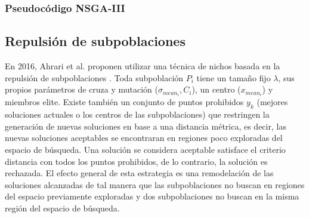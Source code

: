 \documentclass[letterpaper,10pt]{article}
\begin{document}
\subsubsection{Pseudocódigo NSGA-III}
 

\subsection{Repulsión de subpoblaciones}

En 2016, Ahrari et al. proponen utilizar una técnica de nichos basada en la repulsión de subpoblaciones \cite{ahrari2016multimodal}. Toda subpoblación $P_i$ tiene un tamaño fijo $\lambda$,
sus propios parámetros de cruza y mutación ($\sigma_{mean_i},C_i$), un centro ($x_{mean_i}$) y miembros elite. Existe también un conjunto de puntos prohibidos $y_k$
(mejores soluciones actuales o los centros de las subpoblaciones) que restringen la generación de nuevas soluciones en base a una distancia métrica, es decir, las nuevas soluciones aceptables
se encontraran en regiones poco exploradas del espacio de búsqueda. Una solución se considera aceptable satisface el criterio distancia con todos los puntos prohibidos, de lo contrario,
la solución es rechazada. El efecto general de esta estrategia es una remodelación de las soluciones alcanzadas de tal manera que las subpoblaciones no buscan en regiones del espacio
previamente exploradas y dos subpoblaciones no buscan en la misma región del espacio de búsqueda.
\newline
\end{document}
